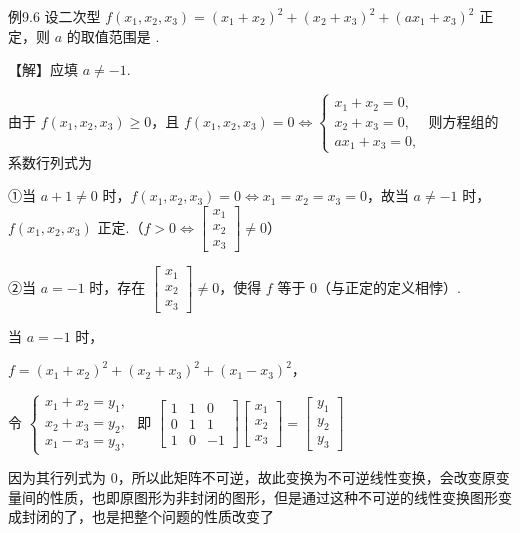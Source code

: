 \begin{fcard}{例9.6}
设二次型 $f(x_1,x_2,x_3)=(x_1+x_2)^2+(x_2+x_3)^2+(ax_1+x_3)^2$ 正定，则 $a$ 的取值范围是 \underline{\hspace{2.5em}}.

【解】应填 $a\ne-1$.

由于 $f(x_1,x_2,x_3)\ge 0$，且 $f(x_1,x_2,x_3)=0\iff\begin{cases}x_1+x_2=0,\\[2pt]x_2+x_3=0,\\[2pt]ax_1+x_3=0,\end{cases}$ 则方程组的系数行列式为


①当 $a+1\ne0$ 时，$f(x_1,x_2,x_3)=0\iff x_1=x_2=x_3=0$，故当 $a\ne-1$ 时，$f(x_1,x_2,x_3)$ 正定.（$f>0\iff\begin{bmatrix}x_1\\x_2\\x_3\end{bmatrix}\ne 0$）

②当 $a=-1$ 时，存在 $\begin{bmatrix}x_1\\x_2\\x_3\end{bmatrix}\ne 0$，使得 $f$ 等于 0（与正定的定义相悖）.


当 $a=-1$ 时，

$f=(x_1+x_2)^2+(x_2+x_3)^2+(x_1-x_3)^2$，

令 $\begin{cases}x_1+x_2=y_1,\\[2pt]x_2+x_3=y_2,\\[2pt]x_1-x_3=y_3,\end{cases}$ 即 $\begin{bmatrix}1&1&0\\0&1&1\\1&0&-1\end{bmatrix}\begin{bmatrix}x_1\\x_2\\x_3\end{bmatrix}=\begin{bmatrix}y_1\\y_2\\y_3\end{bmatrix}$

因为其行列式为 $0$，所以此矩阵不可逆，故此变换为不可逆线性变换，会改变原变量间的性质，也即原图形为非封闭的图形，但是通过这种不可逆的线性变换图形变成封闭的了，也是把整个问题的性质改变了
\end{fcard}

